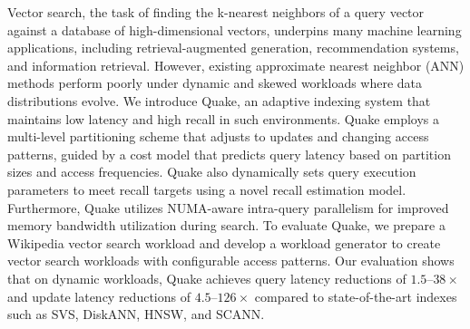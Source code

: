 
Vector search, the task of finding the k-nearest neighbors of a query vector against a database of high-dimensional vectors, underpins many machine learning applications, including retrieval-augmented
generation, recommendation systems, and information retrieval. However, existing approximate nearest neighbor (ANN) methods perform poorly under dynamic and skewed workloads where data distributions evolve. We introduce Quake, an adaptive indexing system that maintains low latency and high recall in such environments. Quake employs a multi-level partitioning scheme that adjusts to updates and changing access patterns, guided by a cost model that predicts query latency based on partition sizes and access frequencies. Quake also dynamically sets query execution parameters to meet recall targets using a novel recall estimation model. Furthermore, Quake utilizes NUMA-aware intra-query parallelism for improved memory bandwidth utilization during search. To evaluate Quake, we prepare a Wikipedia vector search workload and develop a workload generator to create vector search workloads with configurable access patterns. Our evaluation shows that on dynamic workloads, Quake achieves query latency reductions of $1.5$–$38\times$ and update latency reductions of $4.5$–$126\times$ compared to state-of-the-art indexes such as SVS, DiskANN, HNSW, and SCANN.